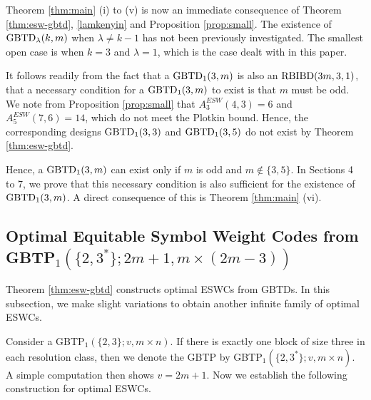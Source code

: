 \documentclass[draft, 11pt]{article}
\begin{document}
Theorem \ref{thm:main} (i) to (v)
 is now an immediate consequence of Theorem \ref{thm:esw-gbtd}, \ref{lamkenyin}
and Proposition \ref{prop:small}.
The existence of $\textrm{GBTD}_\lambda(k,m)$ when $\lambda\not=k-1$ has not been previously
investigated. The smallest open case is when $k=3$ and $\lambda=1$, which is the
case dealt with in this paper.

It follows readily from the fact that a $\textrm{GBTD}_1(3,m)$ is also an ${\rm RBIBD}(3m,3,1)$,
that a necessary condition for a $\textrm{GBTD}_1(3,m)$ to exist is that $m$ must be odd.
We note from Proposition \ref{prop:small} that $A^{ESW}_3(4,3)=6$ and $A^{ESW}_5(7,6)=14$, which do not meet the Plotkin bound.
Hence, the corresponding designs $\textrm{GBTD}_1(3,3)$ and $\textrm{GBTD}_1(3,5)$ do not exist by Theorem \ref{thm:esw-gbtd}.


Hence, a $\textrm{GBTD}_1(3,m)$ can exist only if $m$ is odd and $m\notin \{3,5\}$. In Sections 4 to 7, we prove that this
necessary condition is also sufficient for the existence of $\textrm{GBTD}_1(3,m)$. A direct consequence
of this is Theorem \ref{thm:main} (vi).

 \subsection{Optimal Equitable Symbol Weight Codes from GBTP$_1(\{2,3^*\};2m+1,m\times (2m-3))$}

 Theorem \ref{thm:esw-gbtd} constructs optimal ESWCs from GBTDs.
 In this subsection, we make slight variations to
 obtain another infinite family of optimal ESWCs. %

Consider a GBTP$_1(\{2,3\};v,m\times n)$. If there is
 exactly one block of size three in each resolution class,
 then we denote the GBTP by GBTP$_1(\{2,3^*\};v,m\times n)$.
 A simple computation then shows $v=2m+1$. %
 Now we establish the following construction for optimal ESWCs.
\end{document}
